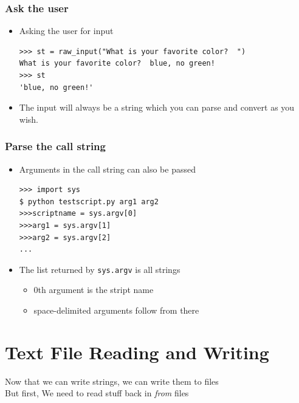 \documentclass{beamer}
\begin{document}
\begin{frame}[fragile]
\frametitle{Ask the user}
\begin{itemize}
\item Asking the user for input
\begin{lstlisting}
>>> st = raw_input("What is your favorite color?  ")
What is your favorite color?  blue, no green!
>>> st
'blue, no green!'
\end{lstlisting}
\item The input will always be a string which you can parse and convert as you wish.
\end{itemize}
\end{frame}

\begin{frame}[fragile]
\frametitle{Parse the call string}
\begin{itemize}
\item Arguments in the call string can also be passed
\begin{lstlisting}
>>> import sys
$ python testscript.py arg1 arg2
>>>scriptname = sys.argv[0]
>>>arg1 = sys.argv[1]
>>>arg2 = sys.argv[2]
...
\end{lstlisting}
\item The list returned by \texttt{sys.argv} is all strings 
\begin{itemize}
\item 0th argument is the stript name
\item space-delimited arguments follow from there
\end{itemize}
\end{itemize}
\end{frame}

\section{Text File Reading and Writing}
\begin{frame}[fragile]
Now that we can write strings, we can write them to files \newline{} \\
But first, We need to read stuff back in \emph{from} files
\end{frame}
\end{document}
